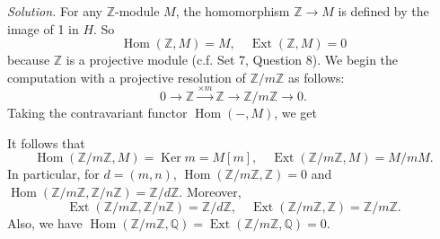 \documentclass{mathproblems}
\newcommand\Q{\mathbb{Q}}
\newcommand\Z{\mathbb{Z}}
\DeclareMathOperator{\Ext}{Ext}
\DeclareMathOperator{\Hom}{Hom}
\DeclareMathOperator{\Ker}{Ker}
\begin{document}
\begin{questions}
\textit{Solution.} For any $\Z$-module $M$, the homomorphism $\Z\to M$ is defined by the image of 1 in $H$. So 
$$
\Hom(\Z,M)=M,\quad \Ext(\Z,M)=0
$$
because $\Z$ is a projective module (c.f. Set 7, Question 8). We begin the computation with a projective resolution of $\Z/m\Z$ as follows:
$$
0\longrightarrow \Z \stackrel{\times m}{\longrightarrow} \Z \longrightarrow \Z/m\Z\longrightarrow 0.
$$
Taking the contravariant functor $\Hom(-,M)$, we get \vspace{-4pt}
\begin{center}
\end{center}\vspace{-4pt}
It follows that
$$
\Hom(\Z/m\Z,M)=\Ker m=M[m],\quad \Ext(\Z/m\Z,M)=M/mM.
$$
In particular, for $d=(m,n)$, $\Hom(\Z/m\Z,\Z)=0$ and $\Hom(\Z/m\Z,\Z/n\Z)=\Z/d\Z$. Moreover,
$$
\Ext(\Z/m\Z,\Z/n\Z)=\Z/d\Z,\quad \Ext(\Z/m\Z,\Z)=\Z/m\Z.
$$
Also, we have $\Hom(\Z/m\Z,\Q)=\Ext(\Z/m\Z,\Q)=0$.





\end{questions}
\end{document}
